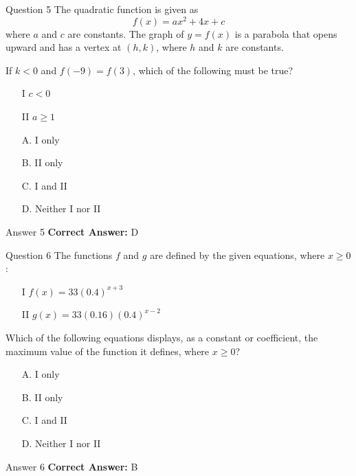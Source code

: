 \documentclass{beamer}
\begin{document}
\begin{frame}{Question 5}
\small
The quadratic function is given as
\[
f(x) = ax^2 + 4x + c
\]
where \(a\) and \(c\) are constants. The graph of \(y = f(x)\) is a parabola that opens upward and has a vertex at \((h, k)\), where \(h\) and \(k\) are constants.

If \(k < 0\) and \(f(-9) = f(3)\), which of the following must be true?

\begin{itemize}
\item[I] \(c < 0\)
\item[II] \(a \geq 1\)
\end{itemize}
\vspace{0.35cm}
\begin{enumerate}
    \item[A.] I only
    \item[B.] II only
    \item[C.] I and II
    \item[D.] Neither I nor II
\end{enumerate}
\end{frame}
\begin{frame}{Answer 5}
\small
\textbf{Correct Answer:} D
\end{frame}

\begin{frame}{Question 6}
\small
The functions \(f\) and \(g\) are defined by the given equations, where \(x \geq 0\):

\begin{itemize}
\item[I] \(f(x) = 33(0.4)^{x+3}\)
\item[II] \(g(x) = 33(0.16)(0.4)^{x-2}\)
\end{itemize}

Which of the following equations displays, as a constant or coefficient, the maximum value of the function it defines, where \(x \geq 0\)?
\vspace{0.35cm}
\begin{enumerate}
    \item[A.] I only
    \item[B.] II only
    \item[C.] I and II
    \item[D.] Neither I nor II
\end{enumerate}
\end{frame}
\begin{frame}{Answer 6}
\small
\textbf{Correct Answer:} B
\end{frame}
\end{document}

